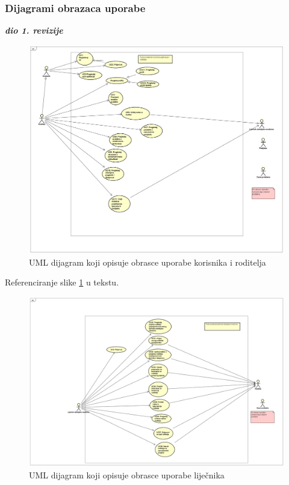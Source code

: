 					
				
					
				\subsubsection{Dijagrami obrazaca uporabe}
					\textbf{\textit{dio 1. revizije}}\\
						\begin{figure}[H]
						\includegraphics[width=\textwidth]{dijagrami/UCroditelj.PNG} %
						\caption{UML dijagram koji opisuje obrasce uporabe korisnika i roditelja}
						\label{fig:promjene3} %
					\end{figure}
					
					Referenciranje slike \ref{fig:promjene3} u tekstu.
					
					\begin{figure}[H]
						\includegraphics[width=\textwidth]{dijagrami/UClijecnik.PNG} %
						\caption{UML dijagram koji opisuje obrasce uporabe liječnika}
						\label{fig:promjene4} %
					\end{figure}
					
